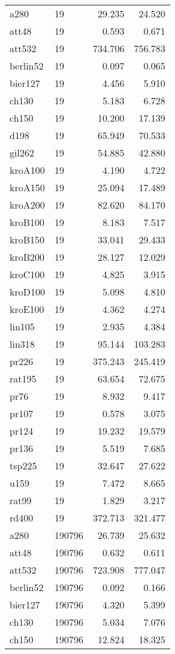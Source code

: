 \begin{center}
\begin{longtable}{llrr}
a280 & 19 & 29.235 & 24.520 \\
att48  & 19 & 0.593 & 0.671 \\
att532  & 19 & 734.706&756.783\\
berlin52  & 19 & 0.097& 0.065\\
bier127  & 19 & 4.456& 5.910\\
ch130  & 19 & 5.183& 6.728\\
ch150  & 19 & 10.200& 17.139\\
d198  & 19 & 65.949&70.533\\
gil262  & 19 & 54.885&42.880\\
kroA100  & 19 & 4.190&4.722\\
kroA150  & 19 & 25.094&17.489\\
kroA200  & 19 & 82.620& 84.170\\
kroB100  & 19 & 8.183&7.517\\
kroB150 & 19 & 33.041& 29.433\\
kroB200  & 19 & 28.127& 12.029\\
kroC100  & 19 & 4.825& 3.915\\
kroD100 & 19 & 5.098& 4.810\\
kroE100  & 19 & 4.362& 4.274\\
lin105  & 19 & 2.935& 4.384\\
lin318  & 19 & 95.144& 103.283\\
pr226  & 19 & 375.243& 245.419\\
rat195  & 19 & 63.654& 72.675\\
pr76  & 19 & 8.932& 9.417\\
pr107  & 19 & 0.578 & 3.075\\
pr124  & 19 & 19.232 & 19.579\\
pr136  & 19 & 5.519& 7.685\\
tsp225  & 19 & 32.647& 27.622\\
u159  & 19 & 7.472& 8.665\\
rat99  & 19 & 1.829& 3.217\\
rd400  & 19 & 372.713& 321.477\\
a280 & 190796 & 26.739& 25.632\\
att48  & 190796 & 0.632& 0.611\\
att532  & 190796 &723.908& 777.047\\
berlin52  & 190796 & 0.092& 0.166\\
bier127  & 190796 & 4.320& 5.399\\
ch130  & 190796 & 5.034& 7.076\\
ch150  & 190796 & 12.824& 18.325\\

\end{longtable}
\end{center}

